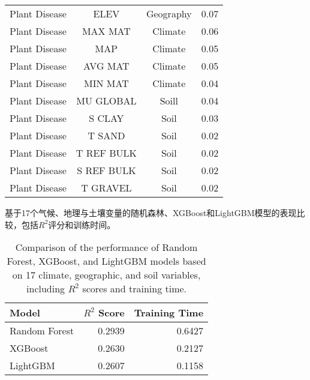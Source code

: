 \documentclass[AutoFakeBold]{LZUThesis-PgD&PhD}
\begin{document}
\begin{table}[H]
\begin{tabular}{cccc}
			Plant Disease & ELEV & Geography & 0.07 \\
			Plant Disease & MAX MAT & Climate & 0.06 \\
			Plant Disease & MAP & Climate & 0.05 \\
			Plant Disease & AVG MAT & Climate & 0.05 \\
			Plant Disease & MIN MAT & Climate & 0.04 \\
			Plant Disease & MU GLOBAL & Soill & 0.04 \\
			Plant Disease & S CLAY & Soil & 0.03 \\
			Plant Disease & T SAND & Soil & 0.02 \\
			Plant Disease & T REF BULK & Soil & 0.02 \\
			Plant Disease & S REF BULK & Soil & 0.02 \\
			Plant Disease & T GRAVEL & Soil & 0.02 \\
			\bottomrule
		\end{tabular}
	\end{table}
%		
	
	
	\begin{table}[H]
		\caption{基于17个气候、地理与土壤变量的随机森林、XGBoost和LightGBM模型的表现比较，包括$R^2$评分和训练时间。} 
		\caption*{Comparison of the performance of Random Forest, XGBoost, and LightGBM models based on 17 climate, geographic, and soil variables, including  $R^2$ scores and training time.}
		\label{tab:model_performance}
		\begin{tabular}{lrr}
			\toprule
			Model & $R^2$ Score & Training Time \\
			\midrule
			Random Forest & 0.2939 & 0.6427 \\
			XGBoost & 0.2630 & 0.2127 \\
			LightGBM & 0.2607 & 0.1158 \\
			\bottomrule
		\end{tabular}
	\end{table}
	
%		
	
\end{document}
